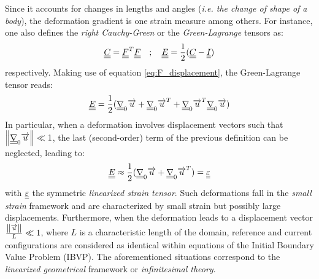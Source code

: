 Since it accounts for changes in lengths and angles (\textit{i.e. the change of shape of a body}), the deformation gradient is one strain measure among others. For instance, one also defines the \textit{right Cauchy-Green} or the \textit{Green-Lagrange} tensors as:
\begin{equation*}
  {\underline{\underline{C}}}={\underline{\underline{F}}}^T{\underline{\underline{F}}} \quad ; \quad {\underline{\underline{E}}}=\frac{1}{2}({\underline{\underline{C}}}-{\underline{\underline{I}}})
\end{equation*}
respectively. Making use of equation \eqref{eq:F_displacement}, the Green-Lagrange tensor reads:
\begin{equation*}
  {\underline{\underline{E}}}=\frac{1}{2}({\underline{\underline{\nabla}}}_0 {\overrightarrow{u}} + {\underline{\underline{\nabla}}}_0 {\overrightarrow{u}}^T + {\underline{\underline{\nabla}}}_0 {\overrightarrow{u}}^T {\underline{\underline{\nabla}}}_0 {\overrightarrow{u}})
\end{equation*}
In particular, when a deformation involves displacement vectors such that $\left\Vert{\underline{\underline{\nabla}}}_0 {\overrightarrow{u}}\right\Vert \ll 1$, the last (second-order) term of the previous definition can be neglected, leading to:
\begin{equation}
  \label{eq:epsilon}
  {\underline{\underline{E}}} \approx \frac{1}{2}({\underline{\underline{\nabla}}}_0 {\overrightarrow{u}} + {\underline{\underline{\nabla}}}_0 {\overrightarrow{u}}^T) = {\underline{\underline{\varepsilon}}}
\end{equation}
with ${\underline{\underline{\varepsilon}}}$ the symmetric \textit{linearized strain tensor}. Such deformations fall in the \textit{small strain} framework and are characterized by small strain but possibly large displacements. Furthermore, when the deformation leads to a displacement vector $\frac{\left\Vert{\overrightarrow{u}}\right\Vert}{L} \ll 1$, where $L$ is a characteristic length of the domain, reference and current configurations are considered as identical within equations of the Initial Boundary Value Problem (IBVP). The aforementioned situations correspond to the \textit{linearized geometrical} framework  or \textit{infinitesimal theory}.

